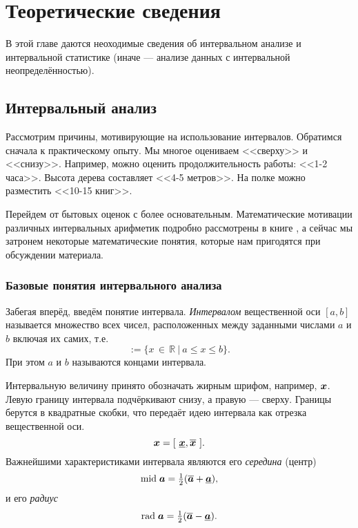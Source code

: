 \documentclass[a5paper,openany]{book}
\newcommand{\mbf}[1]{\protect\text{\boldmath$#1$}}
\newcommand{\ov}{\overline}
\newcommand{\un}{\underline}
\newcommand{\m}{\mathrm{mid}\;}
\renewcommand{\r}{\mathrm{rad}\;}
\begin{document}
\chapter{Теоретические сведения}

В этой главе даются неоходимые сведения об интервальном анализе и интервальной статистике (иначе --- анализе данных с интервальной неопределённостью). 

\section{Интервальный анализ}

Рассмотрим причины, мотивирующие на использование интервалов.  
Обратимся сначала к практическому опыту. Мы многое оцениваем <<сверху>> и  <<снизу>>. Например, можно оценить продолжительность работы: <<1-2 часа>>. Высота дерева составляет <<4-5 метров>>. На полке можно разместить <<10-15 книг>>.

Перейдем от бытовых оценок с более основательным.
Математические мотивации различных интервальных арифметик подробно рассмотрены в книге \cite{SharyBook}, а сейчас мы затронем некоторые математические понятия, которые нам пригодятся при обсуждении материала.


\subsection{Базовые понятия интервального анализа}

Забегая вперёд, введём понятие интервала.
\emph{Интервалом} вещественной оси $[a,b]$ называется множество всех чисел, расположенных между заданными числами  $a$ и $b$ включая их самих, т.е. 
\begin{equation*}
[a,b]:= \{x\, \in \,\mathbb{R}\ |\ a \leq x \leq b \}.
\end{equation*}
При этом $a$ и $b$  называются концами интервала.

Интервальную величину принято обозначать жирным шрифом, например, $\mbf{x}$. Левую границу интервала подчёркивают снизу, а правую --- сверху. Границы берутся в квадратные скобки, что передаёт идею интервала  как отрезка вещественной оси.
\begin{equation*}
\mbf{x} = [\ \un{\mbf{x}}, \ov{\mbf{x}} \ ].
\end{equation*}
Важнейшими характеристиками интервала являются его \emph{середина} (центр) 
\begin{equation*}
\textstyle\index{середина интервала} 
\m\mbf{a} = \frac{1}{2}(\ov{\mbf{a}} + \un{\mbf{a}}),
\end{equation*}
и его \emph{радиус} 
\begin{equation*}
\textstyle\index{радиус интервала} 
\r\mbf{a} = \frac{1}{2}(\ov{\mbf{a}} - \un{\mbf{a}}).
\end{equation*} 
\end{document}
